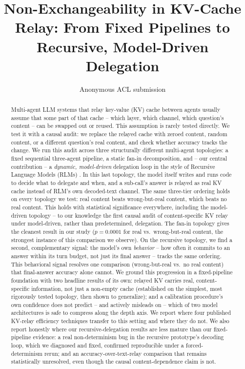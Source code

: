 \documentclass[11pt]{article}
\title{Non-Exchangeability in KV-Cache Relay: From Fixed Pipelines to Recursive, Model-Driven Delegation}
\author{Anonymous ACL submission}
\begin{document}
\maketitle

\begin{abstract}
Multi-agent LLM systems that relay key-value (KV) cache between agents
usually assume that some part of that cache -- which layer, which
channel, which question's content -- can be swapped out or reused. This
assumption is rarely tested directly. We test it with a causal audit: we
replace the relayed cache with zeroed content, random content, or a
different question's real content, and check whether accuracy tracks the
change. We run this audit across three structurally different
multi-agent topologies: a fixed sequential three-agent pipeline, a static
fan-in decomposition, and -- our central contribution -- a
\emph{dynamic, model-driven} delegation loop in the style of Recursive
Language Models (RLMs) \citep{rlm2026}. In this last topology, the model
itself writes and runs code to decide what to delegate and when, and a
sub-call's answer is relayed as real KV cache instead of RLM's own
decoded-text channel. The same three-tier ordering holds on every
topology we test: real content beats wrong-but-real content, which beats
no real content. This holds with statistical significance everywhere,
including the model-driven topology -- to our knowledge the first causal
audit of content-specific KV relay under model-driven, rather than
predetermined, delegation. The fan-in topology gives the cleanest result
in our study ($p=0.0001$ for real vs.\ wrong-but-real content, the
strongest instance of this comparison we observe). On the recursive
topology, we find a second, complementary signal: the model's own
\emph{behavior} -- how often it commits to an answer within its turn
budget, not just its final answer -- tracks the same ordering. This
behavioral signal resolves one comparison (wrong-but-real vs.\ no real
content) that final-answer accuracy alone cannot. We ground this
progression in a fixed-pipeline foundation with two headline results of
its own: relayed KV carries real, content-specific information, not just
a non-empty cache (established on the simplest, most rigorously tested
topology, then shown to generalize); and a calibration procedure's own
confidence does not predict -- and actively misleads on -- which of two
model architectures is safe to compress along the depth axis. We report
where four published KV-relay efficiency techniques transfer to this
setting and where they do not. We also report honestly where our
recursive-delegation results are less mature than our fixed-pipeline
evidence: a real non-determinism bug in the recursive prototype's
decoding loop, which we diagnosed and fixed, confirmed reproducible under
a forced-determinism rerun; and an accuracy-over-text-relay comparison
that remains statistically unresolved, even though the causal
content-dependence claim is not.
\end{abstract}
\end{document}
